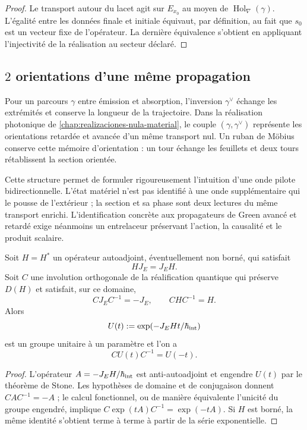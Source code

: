 \begin{proof}
Le transport autour du lacet agit sur \(E_{x_0}\) au moyen de \(\operatorname{Hol}_{\nabla}(\gamma)\). L’égalité entre les données finale et initiale équivaut, par définition, au fait que \(s_0\) est un vecteur fixe de l’opérateur. La dernière équivalence s’obtient en appliquant l’injectivité de la réalisation au secteur déclaré.
\end{proof}

\subsection{\(2\) orientations d’une même propagation}

Pour un parcours \(\gamma\) entre émission et absorption, l’inversion \(\gamma^\vee\) échange les extrémités et conserve la longueur de la trajectoire. Dans la réalisation photonique de \cref{chap:realizaciones-nula-material}, le couple \((\gamma,\gamma^\vee)\) représente les orientations retardée et avancée d’un même transport nul. Un ruban de Möbius conserve cette mémoire d’orientation : un tour échange les feuillets et deux tours rétablissent la section orientée.

Cette structure permet de formuler rigoureusement l’intuition d’une onde pilote bidirectionnelle. L’état matériel n’est pas identifié à une onde supplémentaire qui le pousse de l’extérieur ; la section et sa phase sont deux lectures du même transport enrichi. L’identification concrète aux propagateurs de Green avancé et retardé exige néanmoins un entrelaceur préservant l’action, la causalité et le produit scalaire.

\begin{proposition}
\label{prop:conjugacion-propagador-bidireccional-rev2}
Soit \(H=H^*\) un opérateur autoadjoint, éventuellement non borné, qui satisfait
\[
 HJ_E=J_EH.
\]
Soit \(C\) une involution orthogonale de la réalification quantique qui préserve \(D(H)\) et satisfait, sur ce domaine,
\[
 CJ_EC^{-1}=-J_E,
 \qquad CHC^{-1}=H.
\]
Alors
\[
 U(t):=\exp(-J_EHt/\hbar_{\rm int})
\]
est un groupe unitaire à un paramètre et l’on a
\[
 \boxed{CU(t)C^{-1}=U(-t)}.
\]
\end{proposition}

\begin{proof}
L’opérateur \(A=-J_EH/\hbar_{\rm int}\) est anti-autoadjoint et engendre \(U(t)\) par le théorème de Stone. Les hypothèses de domaine et de conjugaison donnent \(CAC^{-1}=-A\) ; le calcul fonctionnel, ou de manière équivalente l’unicité du groupe engendré, implique \(C\exp(tA)C^{-1}=\exp(-tA)\). Si \(H\) est borné, la même identité s’obtient terme à terme à partir de la série exponentielle.
\end{proof}

